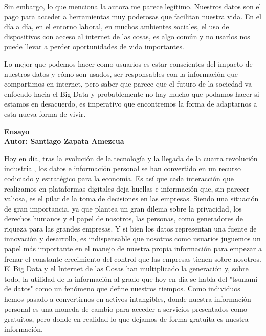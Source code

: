 \documentclass[12pt]{report}
\begin{document}
\begin{enumerate}[label=\textbf{\arabic*.}, leftmargin=*]
Sin embargo, lo que menciona la autora me parece legítimo. Nuestros datos son el pago para acceder a herramientas muy poderosas que facilitan nuestra vida. En el día a día, en el entorno laboral, en muchos ambientes sociales, el uso de dispositivos con acceso al internet de las cosas, es algo común y no usarlos nos puede llevar a perder oportunidades de vida importantes.

Lo mejor que podemos hacer como usuarios es estar conscientes del impacto de nuestros datos y cómo son usados, ser responsables con la información que compartimos en internet, pero saber que parece que el futuro de la sociedad va enfocado hacia el Big Data y probablemente no hay mucho que podamos hacer si estamos en desacuerdo, es imperativo que encontremos la forma de adaptarnos a esta nueva forma de vivir.




\newpage
\textbf{Ensayo\\
Autor: Santiago Zapata Amezcua}

Hoy en día, tras la evolución de la tecnología y la llegada de la cuarta revolución industrial, los datos e información personal se han convertido en un recurso codiciado y estratégico para la economía. Es así que cada interacción que realizamos en plataformas digitales deja huellas e información que, sin parecer valiosa, es el pilar de la toma de decisiones en las empresas. Siendo una situación de gran importancia, ya que plantea un gran dilema sobre la privacidad, los derechos humanos y el papel de nosotros, las personas, como generadores de riqueza para las grandes empresas. Y si bien los datos representan una fuente de innovación y desarrollo, es indispensable que nosotros como usuarios juguemos un papel más importante en el manejo de nuestra propia información para empezar a frenar el constante crecimiento del control que las empresas tienen sobre nosotros.\\

El Big Data y el Internet de las Cosas han multiplicado la generación y, sobre todo, la utilidad de la información al grado que hoy en día se habla del "tsunami de datos" como un fenómeno que define nuestros tiempos. Como individuos hemos pasado a convertirnos en activos intangibles, donde nuestra información personal es una moneda de cambio para acceder a servicios presentados como gratuitos, pero donde en realidad lo que dejamos de forma gratuita es nuestra información.\\


\end{enumerate}
\end{document}
